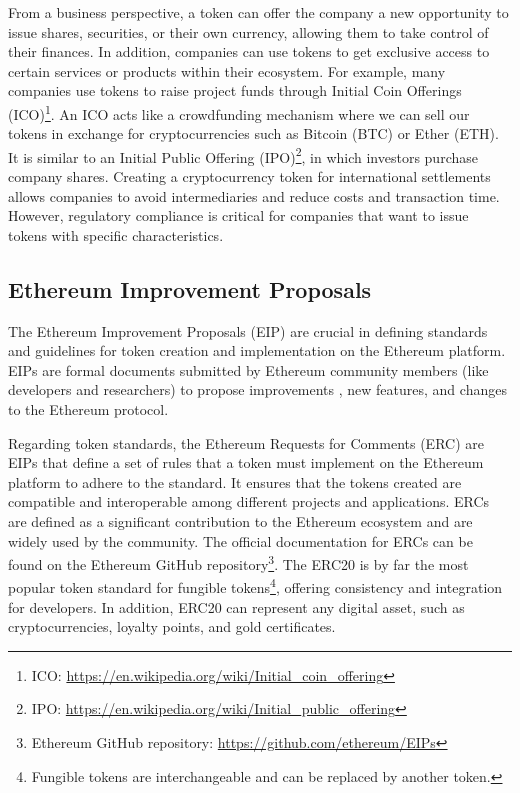 From a business perspective, a token can offer the company a new opportunity to issue shares, securities, or their own
currency, allowing them to take control of their finances. In addition, companies can use tokens to get exclusive access to certain services
or products within their ecosystem. For example, many companies use tokens to raise project funds through Initial Coin Offerings (ICO)\footnote{ICO: \url{https://en.wikipedia.org/wiki/Initial_coin_offering}}.
An ICO acts like a crowdfunding mechanism where we can sell our tokens in exchange for cryptocurrencies such as Bitcoin (BTC) or Ether (ETH).
It is similar to an Initial Public Offering (IPO)\footnote{IPO: \url{https://en.wikipedia.org/wiki/Initial_public_offering}}, in which investors purchase company shares. Creating a cryptocurrency token for
international settlements allows companies to avoid intermediaries and reduce costs and transaction time. However, regulatory compliance is
critical for companies that want to issue tokens with specific characteristics.


\subsection{Ethereum Improvement Proposals}
\label{subsec:eip}

The Ethereum Improvement Proposals (EIP) are crucial in defining standards and guidelines for token creation and implementation on the Ethereum
platform. EIPs are formal documents submitted by Ethereum community members (like developers and researchers) to propose improvements
, new features, and changes to the Ethereum protocol.


Regarding token standards, the Ethereum Requests for Comments (ERC) are EIPs that define a set of rules that a token must implement on the Ethereum
platform to adhere to the standard. It ensures that the tokens created are compatible and interoperable among different projects and applications.
ERCs are defined as a significant contribution to the Ethereum ecosystem and are widely used by the community. The official documentation
for ERCs can be found on the Ethereum GitHub repository\footnote{Ethereum GitHub repository: \url{https://github.com/ethereum/EIPs}}.
The ERC20 is by far the most popular token standard for fungible tokens\footnote{Fungible tokens are interchangeable and can be replaced by another token.},
offering consistency and integration for developers. In addition, ERC20 can represent any digital asset, such as cryptocurrencies, loyalty points, and gold certificates.


